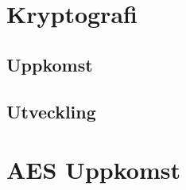 
\section{Kryptografi} %

\subsection{Uppkomst} %

\subsection{Utveckling} %

\section{AES Uppkomst} %

